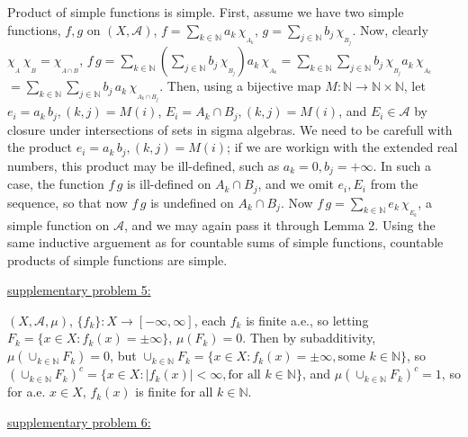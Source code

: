 \documentclass[12pt]{article}
\newcommand{\nats}[0] { \mathbb{N}}
\newcommand{\exreals}[0] {  [-\infty,\infty] }
\begin{document}
\begin{flushleft}
Product of simple functions is simple. First, assume we have two simple functions, $f,g$ on $(X,\mathcal{A})$, $f = \sum_{k \in \mathbb{N}} a_k \, \chi_{_{A_k}}$, $g = \sum_{j \in \mathbb{N}} b_j \, \chi_{_{B_j}} $. Now, clearly $\chi_{_A} \, \chi_{_B} = \chi_{_{A \cap B}}$, 
$f \, g = \sum_{k \in \mathbb{N}} \left( \sum_{j \in \mathbb{N}} b_j \, \chi_{_{B_j}} \right) a_k \, \chi_{_{A_k}} =  \sum_{k \in \mathbb{N}}  \sum_{j \in \mathbb{N}} b_j \, \chi_{_{B_j}} a_k \, \chi_{_{A_k}}  $ $=  \sum_{k \in \mathbb{N}}  \sum_{j \in \mathbb{N}} b_j \, a_k \, \chi_{_{A_k \cap B_j}}$. Then, using a bijective map $M: \nats \rightarrow \nats \times \nats$, let $e_i = a_k \, b_j, (k,j) = M(i)$, $E_i = A_k \cap B_j, (k,j) = M(i)$, and $E_i \in \mathcal{A}$ by closure under intersections of sets in sigma algebras. We need to be carefull with the product $e_i = a_k \, b_j, (k,j) = M(i)$; if we are workign with the extended real numbers, this product may be ill-defined, such as $a_k = 0, b_j = + \infty$. In such a case, the function $f \, g$ is ill-defined on $A_k \cap B_j$, and we omit $e_i,E_i$ from the sequence, so that now $f \, g$ is undefined on $A_k \cap B_j$. Now $f \, g = \sum_{k \in \mathbb{N}} e_k \, \chi_{_{E_k}}$, a simple function on $\mathcal{A}$, and we may again pass it through Lemma 2. Using the same inductive arguement as for countable sums of simple functions, countable products of simple functions are simple.
\end{flushleft} 


\begin{flushleft}
\underline{supplementary problem 5:}
\end{flushleft}

\begin{flushleft}
$(X,\mathcal A, \mu )$, $ \{ f_k \}:X \rightarrow \exreals$, each $f_k$ is finite a.e., so letting $F_k =  \{x \in X: f_k(x) = \pm \infty \}$, $\mu{(F_k)}=0$. Then by subadditivity, $\mu( \cup_{k \in \nats} F_k) = 0$,  but $ \cup_{k \in \nats} F_k = \{ x \in X: f_k(x) = \pm \infty, \textrm{some } k \in \nats \}$, so $( \cup_{k \in \nats} F_k)^c = \{ x \in X: |f_k(x)| < \infty, \textrm{for all } k \in \nats \}$, and $\mu( \cup_{k \in \nats} F_k)^c = 1$, so for a.e. $x \in X$, $f_k(x)$ is finite for all $k \in \nats$.
\end{flushleft}

\begin{flushleft}
\underline{supplementary problem 6:}
\end{flushleft}
\end{document}
